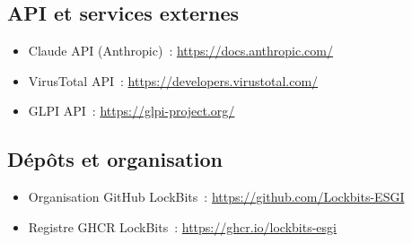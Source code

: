 \subsection*{API et services externes}

\begin{itemize}
  \item Claude API (Anthropic)~: \url{https://docs.anthropic.com/}
  \item VirusTotal API~: \url{https://developers.virustotal.com/}
  \item GLPI API~: \url{https://glpi-project.org/}
\end{itemize}

\subsection*{Dépôts et organisation}

\begin{itemize}
  \item Organisation GitHub LockBits~: \url{https://github.com/Lockbits-ESGI}
  \item Registre GHCR LockBits~: \url{https://ghcr.io/lockbits-esgi}
\end{itemize}
